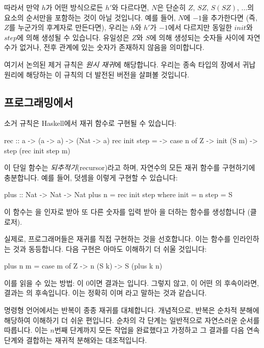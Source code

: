 \documentclass[DaoFP]{subfiles}
\begin{document}
따라서 만약 $h$가 어떤 방식으로든 $h'$와 다르다면, $N$은 단순히 $Z$, $S Z$, $S(S Z)$, ...의 요소의 순서만을 포함하는 것이 아닐 것입니다. 예를 들어, $N$에 $-1$을 추가한다면 (즉, $Z$를 누군가의 후계자로 만든다면), 우리는 $h$와 $h'$가 $-1$에서 다르지만 동일한 $\mathit{init}$와 $\mathit{step}$에 의해 생성될 수 있습니다. 유일성은 $Z$와 $S$에 의해 생성되는 숫자들 사이에 자연수가 없거나, 전후 관계에 있는 숫자가 존재하지 않음을 의미합니다.

여기서 논의된 제거 규칙은 \emph{원시 재귀}에 해당합니다. 우리는 종속 타입의 장에서 귀납 원리에 해당하는 이 규칙의 더 발전된 버전을 살펴볼 것입니다.

\subsection{프로그래밍에서}

소거 규칙은 Haskell에서 재귀 함수로 구현될 수 있습니다:

\begin{haskell}
rec :: a -> (a -> a) -> (Nat -> a)
rec init step = \n ->
  case n of
    Z     -> init
    (S m) -> step (rec init step m)
\end{haskell}

이 단일 함수는 \emph{되추적기}(recursor)라고 하며, 자연수의 모든 재귀 함수를 구현하기에 충분합니다. 예를 들어, 덧셈을 이렇게 구현할 수 있습니다:

\begin{haskell}
plus :: Nat -> Nat -> Nat
plus n = rec init step
  where
    init = n
    step = S
\end{haskell}
이 함수는 을 인자로 받아 또 다른 숫자를 입력 받아 을 더하는 함수를 생성합니다 (클로저).

실제로, 프로그래머들은 재귀를 직접 구현하는 것을 선호합니다. 이는  함수를 인라인하는 것과 동등합니다. 다음 구현은 아마도 이해하기 더 쉬울 것입니다:
\begin{haskell}
plus n m = case m of
  Z -> n
  (S k) -> S (plus k n)
\end{haskell}
이를 읽을 수 있는 방법: 이 0이면 결과는  입니다. 그렇지 않고, 이 어떤 의 후속이라면, 결과는 의 후속입니다. 이는 정확히 이며 라고 말하는 것과 같습니다.

명령형 언어에서는 반복이 종종 재귀를 대체합니다. 개념적으로, 반복은 순차적 분해에 해당하여 이해하기 더 쉬운 편입니다. 순차의 각 단계는 일반적으로 자연스러운 순서를 따릅니다. 이는 $n$번째 단계까지 모든 작업을 완료했다고 가정하고 그 결과를 다음 연속 단계와 결합하는 재귀적 분해와는 대조적입니다.
\end{document}
